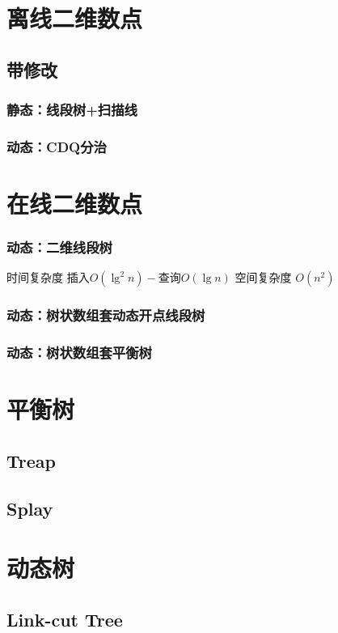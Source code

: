 \documentclass{article}
\begin{document}
	\section{离线二维数点}
		\subsection{带修改}
			\subsubsection{静态：线段树+扫描线}
			\subsubsection{动态：CDQ分治}
	\section{在线二维数点}
		\subsubsection{动态：二维线段树}
		时间复杂度 $\text{插入} O(\lg^2 n) - \text{查询} O(\lg n)$
		空间复杂度 $O(n^2)$
		\subsubsection{动态：树状数组套动态开点线段树}
		\subsubsection{动态：树状数组套平衡树}
	\newpage

	\section{平衡树}
		\subsection{Treap}
		
		\subsection{Splay}
		

	\newpage

	\section{动态树}
		\subsection{Link-cut Tree}
\end{document}
